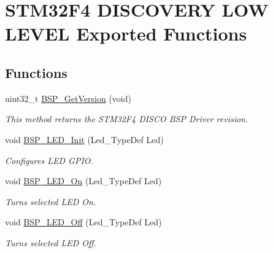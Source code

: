 \hypertarget{group___s_t_m32_f4___d_i_s_c_o_v_e_r_y___l_o_w___l_e_v_e_l___exported___functions}{}\section{S\+T\+M32\+F4 D\+I\+S\+C\+O\+V\+E\+RY L\+OW L\+E\+V\+EL Exported Functions}
\label{group___s_t_m32_f4___d_i_s_c_o_v_e_r_y___l_o_w___l_e_v_e_l___exported___functions}
\subsection*{Functions}
\begin{DoxyCompactItemize}
\item 
uint32\+\_\+t \mbox{\hyperlink{group___s_t_m32_f4___d_i_s_c_o_v_e_r_y___l_o_w___l_e_v_e_l___exported___functions_ga65d13608f7010a8068614154cb142cd6}{B\+S\+P\+\_\+\+Get\+Version}} (void)
\begin{DoxyCompactList}\small\item\em This method returns the S\+T\+M32\+F4 D\+I\+S\+CO B\+SP Driver revision. \end{DoxyCompactList}\item 
void \mbox{\hyperlink{group___s_t_m32_f4___d_i_s_c_o_v_e_r_y___l_o_w___l_e_v_e_l___exported___functions_gab58a4f16a476a53653c5c400e3bed158}{B\+S\+P\+\_\+\+L\+E\+D\+\_\+\+Init}} (Led\+\_\+\+Type\+Def Led)
\begin{DoxyCompactList}\small\item\em Configures L\+ED G\+P\+IO. \end{DoxyCompactList}\item 
void \mbox{\hyperlink{group___s_t_m32_f4___d_i_s_c_o_v_e_r_y___l_o_w___l_e_v_e_l___exported___functions_gaee9c16b16384834c69efabf58f423d6f}{B\+S\+P\+\_\+\+L\+E\+D\+\_\+\+On}} (Led\+\_\+\+Type\+Def Led)
\begin{DoxyCompactList}\small\item\em Turns selected L\+ED On. \end{DoxyCompactList}\item 
void \mbox{\hyperlink{group___s_t_m32_f4___d_i_s_c_o_v_e_r_y___l_o_w___l_e_v_e_l___exported___functions_gaef268680154ca15c45066d64d41f9467}{B\+S\+P\+\_\+\+L\+E\+D\+\_\+\+Off}} (Led\+\_\+\+Type\+Def Led)
\begin{DoxyCompactList}\small\item\em Turns selected L\+ED Off. \end{DoxyCompactList}\item 

\end{DoxyCompactItemize}
